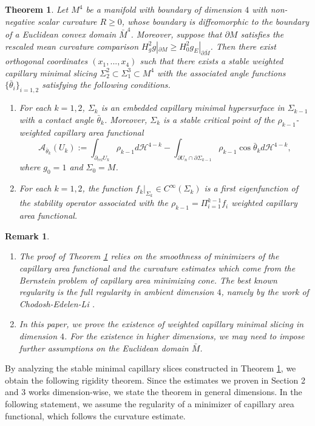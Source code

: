 \documentclass[11pt,letterpaper]{amsart}
\newtheorem{rem}{Remark}[section]
\newtheorem{thm}[problem]{Theorem}
\begin{document}
\begin{thm}\label{main slicing thm}
    Let $M^{4}$ be a manifold with boundary of dimension $4$ with non-negative scalar curvature $R \ge 0$, whose boundary is diffeomorphic to the boundary of a Euclidean convex domain $\bar{M}^{4}$. Moreover, suppose that $\partial M$ satisfies the rescaled mean curvature comparison $H_g^2g|_{\partial M}\geq H_0^2g_{E}|_{\partial \bar{M}}$. Then there exist orthogonal coordinates $(x_{1}, ..., x_{4})$ such that there exists a stable weighted capillary minimal slicing $\Sigma_{2}^{2} \subset \Sigma_{1}^{3} \subset M^{4}$ with the associated angle functions $\{\bar{\theta}_{i}\}_{i=1,2}$ satisfying the following conditions.
    \begin{enumerate}
        \item For each $k=1,2$, $\Sigma_{k}$ is an embedded capillary minimal hypersurface in $\Sigma_{k-1}$ with a contact angle $\bar{\theta}_{k}$. Moreover, $\Sigma_{k}$ is a stable critical point of the $\rho_{k-1}$-weighted capillary area functional
        \[
            \mathcal A_{\bar{\theta}_k}(U_k):=\int_{\partial_{rel}U_k}\rho_{k-1}d \mathcal{H}^{4-k}-\int_{\partial U_n\cap \partial \Sigma_{k-1}}\rho_{k-1} \cos\bar{\theta}_k d \mathcal{H}^{4-k},
        \]
        where $g_{0}=1$ and $\Sigma_{0} = M$.
        \item For each $k=1,2$, the function $f_k|_{\Sigma_{k}} \in C^{\infty}(\Sigma_{k})$ is a first eigenfunction of the stability operator associated with the $\rho_{k-1}=\Pi_{i=1}^{k-1}f_i$ weighted capillary area functional.
    \end{enumerate}
\end{thm}
\begin{rem} 
\begin{enumerate}
    \item The proof of Theorem \ref{main slicing thm} relies on the smoothness of minimizers of the capillary area functional and the curvature estimates which come from the Bernstein problem of capillary area minimizing cone. The best known regularity is the full regularity in ambient dimension $4$, namely by the work of Chodosh-Edelen-Li \cite{chodosh2024improved}. %
    \item In this paper, we prove the existence of weighted capillary minimal slicing in dimension $4$. For the existence in higher dimensions, we may need to impose further assumptions on the Euclidean domain $\bar{M}$.
    \end{enumerate}

\end{rem}
By analyzing the stable minimal capillary slices constructed in Theorem \ref{main slicing thm}, we obtain the following rigidity theorem. Since the estimates we proven in Section 2 and 3 works dimension-wise, we state the theorem in general dimensions. In the following statement, we assume the regularity of a minimizer of capillary area functional, which follows the curvature estimate. 
\end{document}
